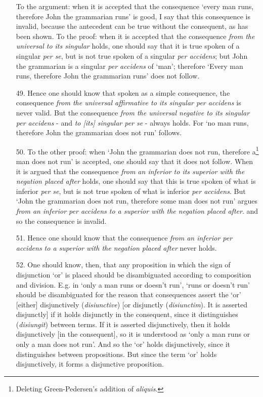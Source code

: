 \begin{enumerate}
To the argument: when it is accepted that the consequence `every man runs, therefore John the grammarian runs' is good, I say that this consequence is invalid, because the antecedent can be true without the consequent, as has been shown. To the proof: when it is accepted that the consequence \textit{from the universal to its singular} holds, one should say that it is true spoken of a singular \textit{per se}, but is not true spoken of a singular \textit{per accidens}; but John the grammarian is a singular \textit{per accidens} of `man'; therefore `Every man runs, therefore John the grammarian runs' does not follow.
\item[49.] Hence one should know that spoken as a simple consequence, the consequence \textit{from the universal affirmative to its singular per accidens} is never valid. But the consequence \textit{from the universal negative to its singular per accidens}  - and \textit{to [its] singular per se} - always holds. For `no man runs, therefore John the grammarian does not run' follows. 
\item[50.] To the other proof: when `John the grammarian does not run, therefore a\footnote{Deleting Green-Pedersen's addition of \textit{aliquis}.} man does not run' is accepted, one should say that it does not follow. When it is argued that the consequence \textit{from an inferior to its superior with the negation placed after} holds, one should say that this is true spoken of what is inferior \textit{per se}, but is not true spoken of what is inferior \textit{per accidens}. But `John the grammarian does not run, therefore some man does not run' argues \textit{from an inferior per accidens to a superior with the negation placed after}. and so the consequence is invalid.
\item[51.] Hence one should know that the consequence \textit{from an inferior per accidens to a superior with the negation placed after} never holds.
\item[52.] One should know, then, that any proposition in which the sign of disjunction `or' is placed should be disambiguated according to composition and division. E.g. in `only a man runs or doesn't run', `runs or doesn't run' should be disambiguated for the reason that consequences assert the `or' [either] disjunctively (\textit{disiunctive}) [or disjunctly (\textit{disiunctim}). It is asserted disjunctly] if it holds disjunctly in the consequent, since it distinguishes (\textit{disiungit}) between terms. If it is asserted disjunctively, then it holds disjunctively [in the consequent], so it is understood as `only a man runs or only a man does not run'. And so the `or' holds disjunctively, since it distinguishes between propositions. But since the term `or' holds disjunctively, it forms a disjunctive proposition.

\end{enumerate}

